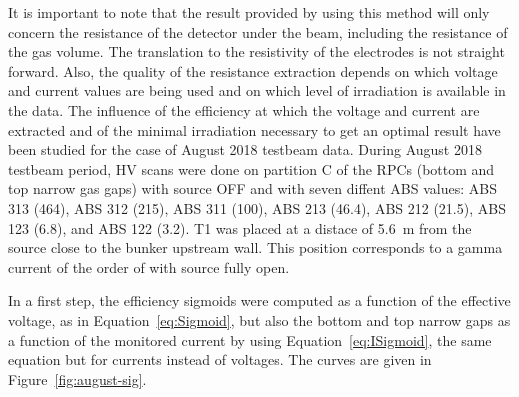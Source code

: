 	It is important to note that the result provided by using this method will only concern the resistance of the detector under the beam, including the resistance of the gas volume. The translation to the resistivity of the electrodes is not straight forward. Also, the quality of the resistance extraction depends on which voltage and current values are being used and on which level of irradiation is available in the data. The influence of the efficiency at which the voltage and current are extracted and of the minimal irradiation necessary to get an optimal result have been studied for the case of August 2018 testbeam data. During August 2018 testbeam period, HV scans were done on partition C of the RPCs (bottom and top narrow gas gaps) with source OFF and with seven diffent ABS values: ABS 313 (464), ABS 312 (215), ABS 311 (100), ABS 213 (46.4), ABS 212 (21.5), ABS 123 (6.8), and ABS 122 (3.2). T1 was placed at a distace of \SI{5.6}{m} from the source close to the bunker upstream wall. This position corresponds to a gamma current of the order of \siflux with source fully open.
	
\endgroup
	
	In a first step, the efficiency sigmoids were computed as a function of the effective voltage, as in Equation~\ref{eq:Sigmoid}, but also the bottom and top narrow gaps as a function of the monitored current by using Equation~\ref{eq:ISigmoid}, the same equation but for currents instead of voltages. The curves are given in Figure~\ref{fig:august-sig}.
	
\begingroup\setlength{\intextsep}{0pt}\setlength{\columnsep}{15pt}
	
